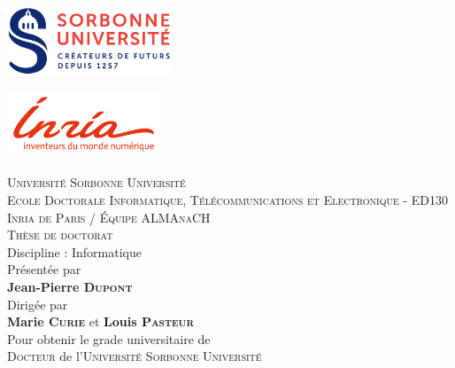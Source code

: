 
\begin{titlepage}

	\begin{center}
		\begin{minipage}[t]{0.4\textwidth}
			\includegraphics[height=2cm]{static/media/sorbonne}
		\end{minipage}%
		\hfill
		\begin{minipage}[t]{0.4\textwidth}
			\hfill
			\includegraphics[height=2cm]{static/media/inria}
		\end{minipage}

		\vspace{0.2cm}
		\LARGE \textsc{Université Sorbonne Université}\\
		\vspace{0.2cm}
		\normalsize \textsc{Ecole Doctorale Informatique, Télécommunications et Electronique} - ED130\\
		\vspace{0.2cm}
		\textsc{Inria de Paris / Équipe ALMAnaCH}\\

		\vspace{0.4cm}
		\Large \textsc{Thèse de doctorat}\\
		\normalsize Discipline : Informatique\\
		\vspace{0.4cm}
		\normalsize Présentée par \\
		\LARGE \textbf{Jean-Pierre \textsc{Dupont}}\\
		\vspace{0.4cm}
		\normalsize Dirigée par \\
		\Large \textbf{Marie \textsc{Curie}} et \textbf{Louis \textsc{Pasteur}}\\
		\vspace{0.4cm}
		\normalsize Pour obtenir le grade universitaire de\\
		\Large \textsc{Docteur} de l'\textsc{Université Sorbonne Université}


\end{center}
\end{titlepage}
